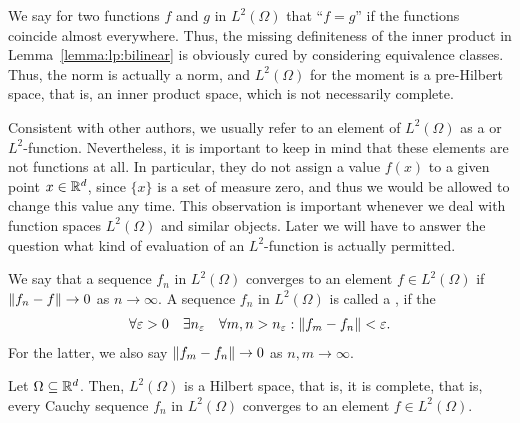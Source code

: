 \begin{note}
  We say for two functions $f$ and $g$ in $L^2(\Omega)$ that ``$f=g$''
  if the functions coincide almost everywhere.
  Thus, the missing definiteness of the inner product in
  Lemma~\ref{lemma:lp:bilinear} is obviously cured by considering
  equivalence classes. Thus, the norm is actually a norm, and
  $L^2(\Omega)$ for the moment is a pre-Hilbert space, that is, an
  inner product space, which is not necessarily complete.
\end{note}

\begin{remark}
  Consistent with other authors, we usually refer to an element of
  $L^2(\Omega)$ as a  or
  $L^2$-function. Nevertheless, it is important to keep in mind that
  these elements are not functions at all. In particular, they do not
  assign a value $f(x)$ to a given point $x\in \mathbb R^d$, since $\{x\}$ is
  a set of measure zero, and thus we would be allowed to change this
  value any time. This observation is important whenever we deal with
  function spaces $L^2(\Omega)$ and similar objects. Later we will
  have to answer the question what kind of evaluation of an
  $L^2$-function is actually permitted.
\end{remark}

\begin{definition}
  We say that a sequence $f_n$ in $L^2(\Omega)$ converges to an
  element $f\in L^2(\Omega)$ if $\left\|f_n-f\right\|\to 0$ as $n\to\infty$. A
  sequence $f_n$ in $L^2(\Omega)$ is called a , if the 
  \begin{gather}
    \label{eq:lp:cauchy}
    \forall \varepsilon>0
    \quad \exists n_\varepsilon
    \quad\forall m,n>n_\varepsilon :
    \left\|f_m-f_n\right\| < \varepsilon.
  \end{gather}
  For the latter, we also say $\left\|f_m-f_n\right\|\to 0$ as
  $n,m\to\infty$. 
\end{definition}

\begin{theorem}
  Let $\Omega\subseteq \mathbb R^d$. Then,
  $L^2(\Omega)$ is a Hilbert space, that is, it is complete, that is,
  every Cauchy sequence $f_n$ in $L^2(\Omega)$ converges to an
  element $f\in L^2(\Omega)$.
\end{theorem}

